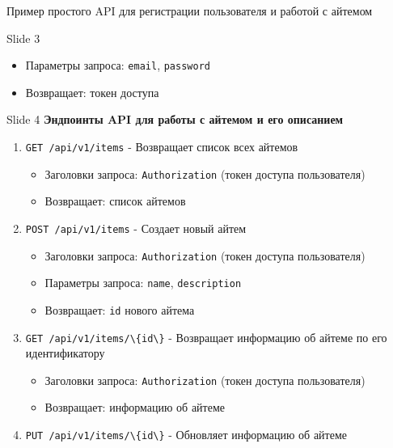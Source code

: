 \documentclass[
  ignorenonframetext,
  aspectratio=169,
  aspectratio=169]{beamer}
\newcommand{\passthrough}[1]{#1}
\providecommand{\tightlist}{%
  \setlength{\itemsep}{0pt}\setlength{\parskip}{0pt}}
\begin{document}
\begin{frame}[fragile]{Пример простого API для регистрации пользователя
и работой с айтемом}
\begin{block}{Slide 3}
\begin{enumerate}
  \begin{itemize}
  \tightlist
  \item
    Параметры запроса: \passthrough{\lstinline!email!},
    \passthrough{\lstinline!password!}
  \item
    Возвращает: токен доступа
  \end{itemize}
\end{enumerate}
\end{block}

\begin{block}{Slide 4}
\protect\hypertarget{slide-4}{}
\textbf{Эндпоинты API для работы с айтемом и его описанием}

\begin{enumerate}
\tightlist
\item
  \passthrough{\lstinline!GET /api/v1/items!} - Возвращает список всех
  айтемов

  \begin{itemize}
  \tightlist
  \item
    Заголовки запроса: \passthrough{\lstinline!Authorization!} (токен
    доступа пользователя)
  \item
    Возвращает: список айтемов
  \end{itemize}
\item
  \passthrough{\lstinline!POST /api/v1/items!} - Создает новый айтем

  \begin{itemize}
  \tightlist
  \item
    Заголовки запроса: \passthrough{\lstinline!Authorization!} (токен
    доступа пользователя)
  \item
    Параметры запроса: \passthrough{\lstinline!name!},
    \passthrough{\lstinline!description!}
  \item
    Возвращает: \passthrough{\lstinline!id!} нового айтема
  \end{itemize}
\item
  \passthrough{\lstinline!GET /api/v1/items/\{id\}!} - Возвращает
  информацию об айтеме по его идентификатору

  \begin{itemize}
  \tightlist
  \item
    Заголовки запроса: \passthrough{\lstinline!Authorization!} (токен
    доступа пользователя)
  \item
    Возвращает: информацию об айтеме
  \end{itemize}
\item
  \passthrough{\lstinline!PUT /api/v1/items/\{id\}!} - Обновляет
  информацию об айтеме


\end{enumerate}
\end{block}
\end{frame}
\end{document}
